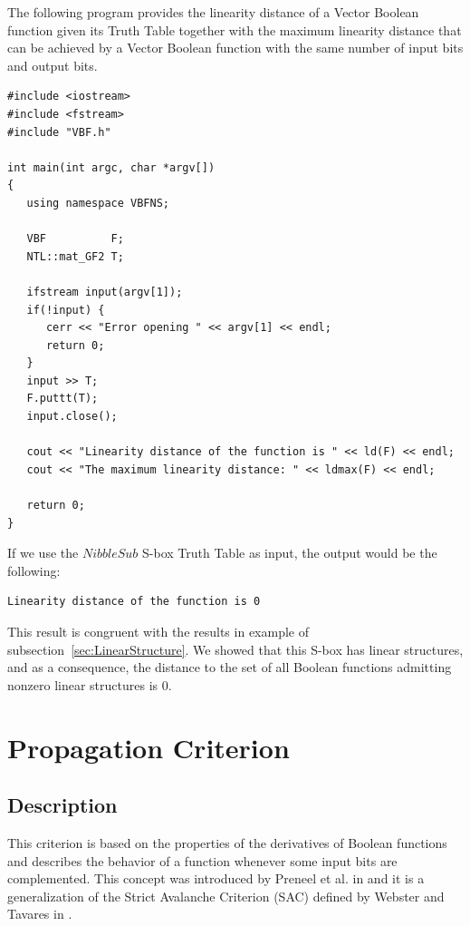 \begin{example}
The following program provides the linearity distance of a Vector Boolean function given its Truth Table together with the maximum linearity distance that can be achieved by a Vector Boolean function with the same number of input bits and output bits.

\begin{verbatim}
#include <iostream>
#include <fstream>
#include "VBF.h"

int main(int argc, char *argv[])
{
   using namespace VBFNS;

   VBF          F;
   NTL::mat_GF2 T;

   ifstream input(argv[1]);
   if(!input) {
      cerr << "Error opening " << argv[1] << endl;
      return 0;
   }
   input >> T;
   F.puttt(T);
   input.close();

   cout << "Linearity distance of the function is " << ld(F) << endl;
   cout << "The maximum linearity distance: " << ldmax(F) << endl;

   return 0;
}
\end{verbatim}

If we use the $NibbleSub$ S-box Truth Table as input, the output would be the following:

\begin{verbatim}
Linearity distance of the function is 0
\end{verbatim}

This result is congruent with the results in example of subsection~\ref{sec:LinearStructure}. We showed that this S-box has linear structures, and as a consequence, the distance to the set of all Boolean functions admitting nonzero linear structures is 0.  
\end{example}

\section{Propagation Criterion}

\subsection{Description}

This criterion is based on the properties of the derivatives of Boolean functions and describes the behavior of a function whenever some input bits are complemented. This concept was introduced by Preneel et al. in \cite{PreneelLLGV90} and it is a generalization of the Strict Avalanche Criterion (SAC) defined by Webster and Tavares in \cite{c85-Webster-Tavares}.

